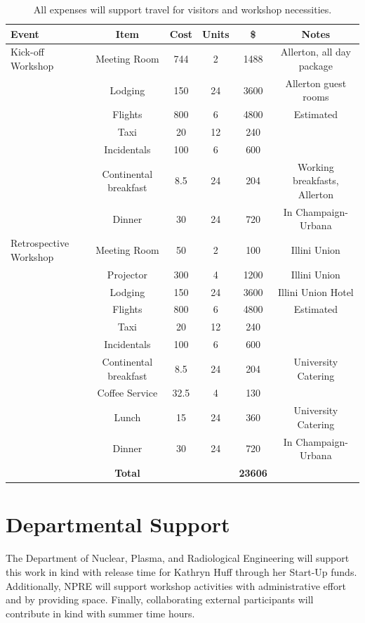 \documentclass[11pt]{article}
\begin{document}
\begin{table}[h!]
        \begin{tabularx}{\textwidth}{|X|c|c|c|c|c|}
        \hline
        \textbf{Event} & \textbf{Item} & \textbf{Cost} & \textbf{Units} & \textbf{\$} & \textbf{Notes}\\ 
        \hline
Kick-off Workshop&Meeting Room&744&2&1488&Allerton, all day package\\
&Lodging&150&24&3600&Allerton guest rooms\\
&Flights&800&6&4800&Estimated\\
&Taxi&20&12&240&\\
&Incidentals&100&6&600&\\
&Continental breakfast&8.5&24&204&Working breakfasts, Allerton\\
&Dinner&30&24&720&In Champaign-Urbana\\
\hline
Retrospective Workshop&Meeting Room&50&2&100&Illini Union\\
&Projector&300&4&1200&Illini Union\\
&Lodging&150&24&3600&Illini Union Hotel\\
&Flights&800&6&4800&Estimated\\
&Taxi&20&12&240&\\
&Incidentals&100&6&600&\\
&Continental breakfast&8.5&24&204&University Catering\\
&Coffee Service&32.5&4&130&\\
&Lunch&15&24&360&University Catering\\
&Dinner&30&24&720&In Champaign-Urbana\\
        \hline
        &\textbf{Total}&&&\textbf{23606}&\\
        \hline
\end{tabularx}
\caption{All expenses will support travel for visitors and workshop 
necessities.}
\label{tab:budget}
\end{table}



          \section{Departmental Support}
          The Department of Nuclear, Plasma, and Radiological Engineering will 
          support this work in kind with release time for Kathryn Huff through 
          her Start-Up funds.  Additionally, NPRE will support workshop activities 
          with administrative effort and by providing space. Finally, 
          collaborating external participants will contribute in kind with 
          summer time hours.


          
          


          
\end{document}
